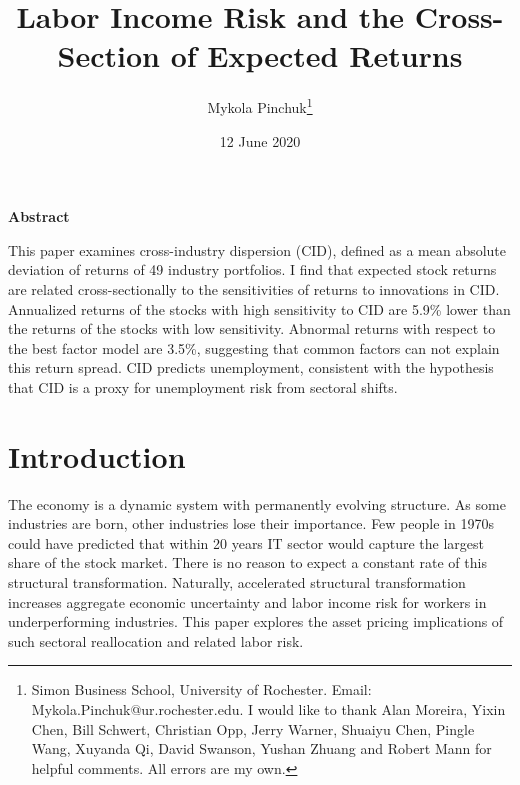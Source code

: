 \documentclass[12pt]{article}
\begin{document}
\onehalfspacing      %
\renewcommand{\footnote}{\endnote}  %

\author{\large{Mykola Pinchuk}\thanks{\rm Simon Business School, University of Rochester. Email: Mykola.Pinchuk@ur.rochester.edu. \newline I would like to thank Alan Moreira, Yixin Chen, Bill Schwert, Christian Opp, Jerry Warner, Shuaiyu Chen, Pingle Wang, Xuyanda Qi, David Swanson, Yushan Zhuang and Robert Mann for helpful comments. All errors are my own.}}

\title{\bf Labor Income Risk and the Cross-Section of Expected Returns}

\date{12 June 2020}  

\maketitle
\thispagestyle{empty}

\bigskip

\normalsize
\vspace{1cm}

\centerline{\bf Abstract}

\vspace{0.5cm}

\begin{onehalfspace}  %
  \noindent This paper examines cross-industry dispersion (CID), defined as a mean absolute deviation of returns of 49 industry portfolios. I find that expected stock returns are related cross-sectionally to the sensitivities of returns to innovations in CID. Annualized returns of the stocks with high sensitivity to CID are 5.9\% lower than the returns of the stocks with low sensitivity. Abnormal returns with respect to the best factor model are 3.5\%, suggesting that common factors can not explain this return spread. CID predicts unemployment, consistent with the hypothesis that CID is a proxy for unemployment risk from sectoral shifts. 
\end{onehalfspace}
\medskip


\clearpage
{}


\section{Introduction} \label{sec:Model}
The economy is a dynamic system with permanently evolving structure. As some industries are born, other industries lose their importance. Few people in 1970s could have predicted that within 20 years IT sector would capture the largest share of the stock market. There is no reason to expect a constant rate of this structural transformation. Naturally, accelerated structural transformation increases aggregate economic uncertainty and labor income risk for workers in underperforming industries. This paper explores the asset pricing implications of such sectoral reallocation and related labor risk.
\end{document}
